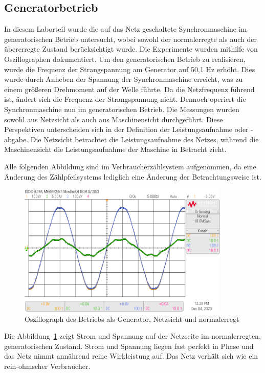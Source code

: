 \documentclass{report}
\begin{document}
\subsection{Generatorbetrieb}
\label{sec:generatorbetrieb}

In diesem Laborteil wurde die auf das Netz geschaltete Synchronmaschine im generatorischen Betrieb untersucht, wobei sowohl der normalerregte als auch der übererregte Zustand berücksichtigt wurde. Die Experimente wurden mithilfe von Oszillographen dokumentiert. Um den generatorischen Betrieb zu realisieren, wurde die Frequenz der Strangspannung am Generator auf 50,1 Hz erhöht. Dies wurde durch Anheben der Spannung der Synchronmaschine erreicht, was zu einem größeren Drehmoment auf der Welle führte. Da die Netzfrequenz führend ist, ändert sich die Frequenz der Strangspannung nicht. Dennoch operiert die Synchronmaschine nun im generatorischen Betrieb. Die Messungen wurden sowohl aus Netzsicht als auch aus Maschinensicht durchgeführt. Diese Perspektiven unterscheiden sich in der Definition der Leistungsaufnahme oder -abgabe. Die Netzsicht betrachtet die Leistungsaufnahme des Netzes, während die Maschinensicht die Leistungsaufnahme der Maschine in Betracht zieht.

Alle folgenden Abbildung sind im Verbraucherzählsystem aufgenommen, da eine Änderung des Zählpfeilsystems lediglich eine Änderung der Betrachtungsweise ist.

\begin{figure}[!ht]
	\centering
	\includegraphics[width=0.9\textwidth]{./assets/img/synchronisation_netz_generator_ne_vzp.png}
	\caption{Oszillograph des Betriebs als Generator, Netzsicht und normalerregt}
	\label{fig:sngn}
\end{figure}

Die Abbildung~\ref{fig:sngn} zeigt Strom und Spannung auf der Netzseite im normalerregten, generatorischen Zustand. Strom und Spannung liegen fast perfekt in Phase und das Netz nimmt annährend reine Wirkleistung auf. Das Netz verhält sich wie ein rein-ohmscher Verbraucher.
\end{document}
